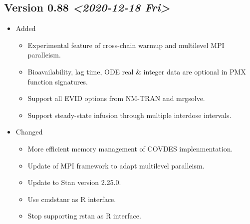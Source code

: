 \documentclass[10pt, reqno, oneside]{amsbook}
\numberwithin{equation}{chapter}
\numberwithin{figure}{chapter}
\numberwithin{table}{chapter}
\theoremstyle{remark}
\begin{document}
\subsection*{Version 0.88 \textit{<2020-12-18 Fri>}}
\label{sec:orgd58bb02}
\begin{itemize}
\item Added
\label{0-85-added}
\begin{itemize}
\item Experimental feature of cross-chain warmup and multilevel MPI paralleism.
\item Bioavailability, lag time, ODE real \& integer data are optional in PMX function signatures.
\item Support all EVID options from NM-TRAN and mrgsolve.
\item Support steady-state infusion through multiple interdose intervals.
\end{itemize}
\item Changed
\label{0-85-changed}
\begin{itemize}
\item More efficient memory management of COVDES implenmentation.
\item Update of MPI framework to adapt multilevel paralleism.
\item Update to Stan version 2.25.0.
\item Use cmdstanr as R interface.
\item Stop supporting rstan as R interface.
\end{itemize}
\end{itemize}
\end{document}
